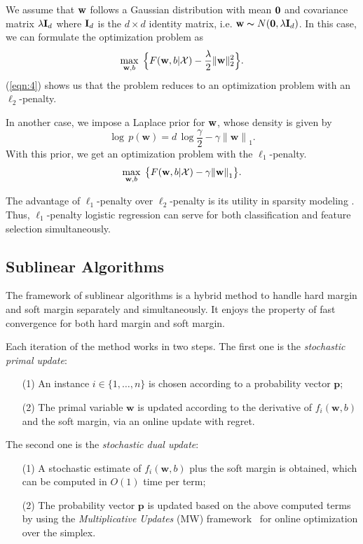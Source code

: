 \documentclass{llncs}
\newcommand{\bw}{\mathbf{w}}
\newcommand{\bp}{\mathbf{p}}
\newcommand{\lc}{\left(}
\newcommand{\rc}{\right)}
\def\I{{\bf I}}
\def\w{{\bf w}}
\def\0{{\bf 0}}
\def\XM{{\mathcal X}}
\begin{document}
We assume that $\w$ follows a Gaussian distribution with mean $\0$ and covariance matrix $\lambda \I_d$ where $\I_d$ is the $d{\times}d$ identity matrix, i.e. $\w \thicksim N(\0, \lambda \I_d)$.
In this case, we can formulate the optimization problem as
\begin{equation} \label{eqn:4}
	\max_{\bw ,b} \; \Big\{F(\w, b| \XM) - \frac{\lambda}{2}  \|\bw\|_2^{2} \Big\}.
\end{equation}
(\ref{eqn:4}) shows us that the problem reduces to an optimization problem with an $\ell_2$-penalty.
	
In another case, we impose a Laplace prior for $\w$, whose density is given by
\[	
\log\,p\lc\bw \rc=d\,\log\frac{\gamma}{2}-\gamma{\|\bw\|}_{1}.
\]
With this prior, we get an optimization problem with the $\ell_1$-penalty.
\begin{equation} \label{eqn:5}
	\max_{\bw ,b} \;  \big\{F(\w, b|\XM)- \gamma{\|\bw \|}_{1}\big\}.	
\end{equation}

The advantage of $\ell_1$-penalty over $\ell_2$-penalty is its utility in sparsity modeling \cite{tibshirani1996regression} .
Thus, $\ell_1$-penalty logistic regression can serve for both classification and feature selection simultaneously.

\subsection{Sublinear Algorithms}

The framework of sublinear algorithms is a hybrid method to handle hard margin and soft margin separately and simultaneously.
It enjoys the property of fast convergence for both hard margin and soft margin.

Each iteration of the method works in two steps.
The first one is the \textit{stochastic primal update}:
\begin{enumerate}
\item[{(1)}] \; An instance $i\in \{1,\ldots, n\}$ is chosen according to a probability vector $\bp$;
\item[{(2)}] \; The primal variable $\bw$ is updated according to the derivative of $f_i(\bw,b)$ and the soft margin, via an online update with regret.
\end{enumerate}

The second one is the \textit{stochastic dual update}:
\begin{enumerate}
\item[{(1)}] \; A stochastic estimate of $f_i(\bw,b)$ plus the soft margin is obtained, which can be computed in $O(1)$ time per term;
\item[{(2)}] \; The probability vector $\bp$ is updated based on the above computed terms by using the \textit{Multiplicative Updates} (MW) framework~\cite{arora2005multiplicative} for online optimization over the simplex.
\end{enumerate}
\end{document}
